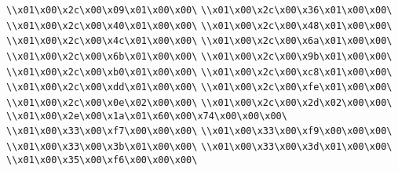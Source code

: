 \verb|\\x01\x00\x2c\x00\x09\x01\x00\x00\|\newline
\verb|\\x01\x00\x2c\x00\x36\x01\x00\x00\|\newline
\verb|\\x01\x00\x2c\x00\x40\x01\x00\x00\|\newline
\verb|\\x01\x00\x2c\x00\x48\x01\x00\x00\|\newline
\verb|\\x01\x00\x2c\x00\x4c\x01\x00\x00\|\newline
\verb|\\x01\x00\x2c\x00\x6a\x01\x00\x00\|\newline
\verb|\\x01\x00\x2c\x00\x6b\x01\x00\x00\|\newline
\verb|\\x01\x00\x2c\x00\x9b\x01\x00\x00\|\newline
\verb|\\x01\x00\x2c\x00\xb0\x01\x00\x00\|\newline
\verb|\\x01\x00\x2c\x00\xc8\x01\x00\x00\|\newline
\verb|\\x01\x00\x2c\x00\xdd\x01\x00\x00\|\newline
\verb|\\x01\x00\x2c\x00\xfe\x01\x00\x00\|\newline
\verb|\\x01\x00\x2c\x00\x0e\x02\x00\x00\|\newline
\verb|\\x01\x00\x2c\x00\x2d\x02\x00\x00\|\newline
\verb|\\x01\x00\x2e\x00\x1a\x01\x60\x00\x74\x00\x00\x00\|\newline
\verb|\\x01\x00\x33\x00\xf7\x00\x00\x00\|\newline
\verb|\\x01\x00\x33\x00\xf9\x00\x00\x00\|\newline
\verb|\\x01\x00\x33\x00\x3b\x01\x00\x00\|\newline
\verb|\\x01\x00\x33\x00\x3d\x01\x00\x00\|\newline
\verb|\\x01\x00\x35\x00\xf6\x00\x00\x00\|\newline
